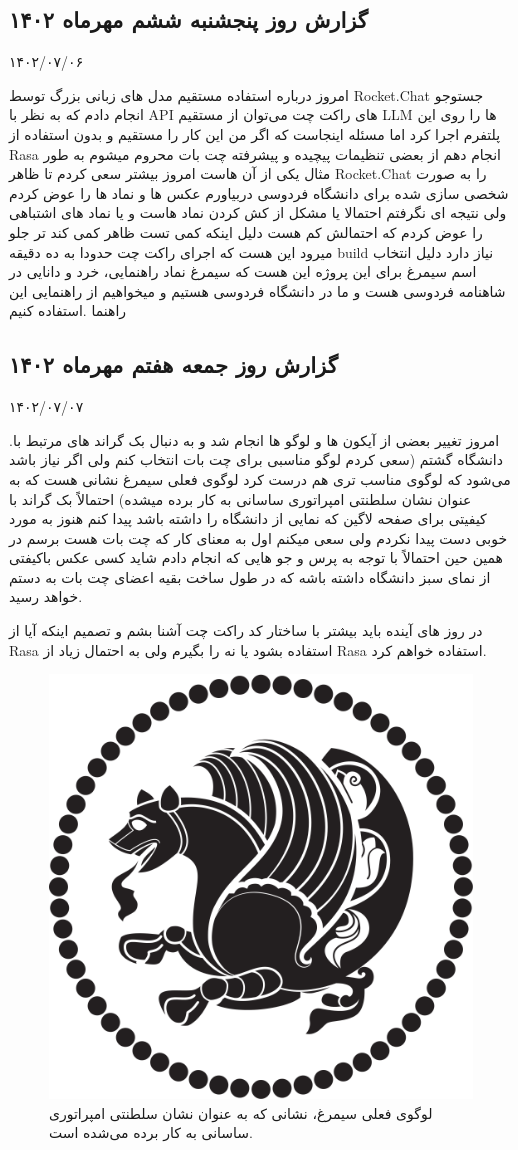 \subsection{گزارش روز پنجشنبه ششم مهرماه ۱۴۰۲}

۱۴۰۲/۰۷/۰۶

امروز درباره استفاده مستقیم مدل های زبانی بزرگ توسط Rocket.Chat جستوجو انجام دادم که به نظر با API های راکت چت می‌توان از مستقیم LLM ها را روی این پلتفرم اجرا کرد اما مسئله اینجاست که اگر من این کار را مستقیم و بدون استفاده از Rasa انجام دهم از بعضی تنظیمات پیچیده و پیشرفته چت بات محروم میشوم به طور مثال  یکی از آن هاست
امروز بیشتر سعی کردم تا ظاهر Rocket.Chat را به صورت شخصی سازی شده برای دانشگاه فردوسی دربیاورم عکس ها و نماد ها را عوض کردم ولی نتیجه ای نگرفتم احتمالا یا مشکل از کش کردن نماد هاست و یا نماد های اشتباهی را عوض کردم که احتمالش کم هست دلیل اینکه کمی تست ظاهر کمی کند تر جلو میرود این هست که اجرای راکت چت حدودا به ده دقیقه build نیاز دارد
دلیل انتخاب اسم سیمرغ برای این پروژه این هست که سیمرغ نماد راهنمایی، خرد و دانایی در شاهنامه فردوسی هست و ما در دانشگاه فردوسی هستیم و میخواهیم از راهنمایی این راهنما .استفاده کنیم


\subsection{گزارش روز جمعه هفتم مهرماه ۱۴۰۲}

۱۴۰۲/۰۷/۰۷

.امروز تغییر بعضی از آیکون ها و لوگو ها انجام شد و به دنبال بک گراند های مرتبط با دانشگاه گشتم (سعی کردم لوگو مناسبی برای چت بات انتخاب کنم ولی اگر نیاز باشد می‌شود که لوگوی مناسب تری هم درست کرد لوگوی فعلی سیمرغ نشانی هست که به عنوان نشان سلطنتی امپراتوری ساسانی به کار برده میشده) احتمالاً بک گراند با کیفیتی برای صفحه لاگین که نمایی از دانشگاه را داشته باشد پیدا کنم هنوز به مورد خوبی دست پیدا نکردم ولی سعی میکنم اول به معنای کار که چت بات هست برسم در همین حین احتمالاً با توجه به پرس و جو هایی که انجام دادم شاید کسی عکس باکیفتی از نمای سبز دانشگاه داشته باشه که در طول ساخت بقیه اعضای چت بات به دستم خواهد رسید.

در روز های آینده باید بیشتر با ساختار کد راکت چت آشنا بشم و تصمیم اینکه آیا از Rasa استفاده بشود یا نه را بگیرم ولی به احتمال زیاد از Rasa استفاده خواهم کرد.


\begin{figure}[h]
    \centering
    \includegraphics[width=0.5\linewidth]{Images/Simurgh_Logo.png}
    \caption{لوگوی فعلی سیمرغ، نشانی که به عنوان نشان سلطنتی امپراتوری ساسانی به کار برده می‌شده است.}
\end{figure}


